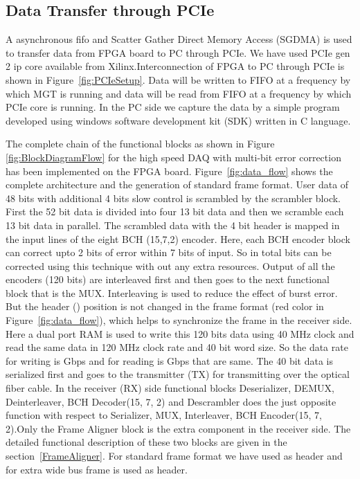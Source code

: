 \documentclass[10pt, conference, compsocconf]{IEEEtran}
\begin{document}
\subsection{Data Transfer through PCIe}
A asynchronous fifo and Scatter Gather Direct Memory Access (SGDMA) is used to transfer data from FPGA board to PC through PCIe. We have used PCIe gen 2 ip core available from Xilinx.Interconnection of FPGA to PC through PCIe is shown in Figure~\ref{fig:PCIeSetup}. Data will be written to FIFO at a frequency by which MGT is running and  data will be read from FIFO at a frequency by which PCIe core is running. In the PC side we capture the data by a simple program developed using windows software development kit (SDK) written in C language.  

\par
 The complete chain of the functional blocks as shown in Figure~ \ref{fig:BlockDiagramFlow} for the high speed DAQ with multi-bit error correction  has been implemented on the FPGA board. Figure~\ref{fig:data_flow} shows the complete architecture and the generation of standard frame format. User data of 48 bits with additional 4 bits slow control is scrambled by the scrambler block. First the 52 bit data is divided into four 13 bit data and then we scramble each 13 bit data in parallel. The scrambled data with the 4 bit header is mapped in the input lines of the eight BCH (15,7,2) encoder. Here, each BCH encoder block can correct upto 2 bits of error within 7 bits of input. So in total    bits can be corrected using this technique with out any extra resources. Output of all the encoders (120 bits) are interleaved first and then goes to the next functional block that is the MUX. Interleaving is used to reduce the effect of burst error. But the header () position is not changed in the frame format (red color in Figure~\ref{fig:data_flow}), which helps to synchronize the frame in the receiver side. Here a dual port RAM is used to write this 120 bits data using 40 MHz clock and read the same data in 120 MHz clock rate and 40 bit word size. So the data rate  for writing is  Gbps  and for reading is  Gbps that are same. The 40 bit data is serialized first and goes to the transmitter (TX) for transmitting over the optical fiber cable. In the receiver (RX) side functional blocks Deserializer, DEMUX, Deinterleaver, BCH Decoder(15, 7, 2) and Descrambler does the just opposite function with respect to Serializer, MUX, Interleaver, BCH Encoder(15, 7, 2).Only the Frame Aligner block is the extra component in the receiver side.  The detailed functional description of these two blocks are given in  the section~\ref{FrameAligner}. For standard frame format we have used  as header and for extra wide bus frame  is used as header. 
\end{document}
